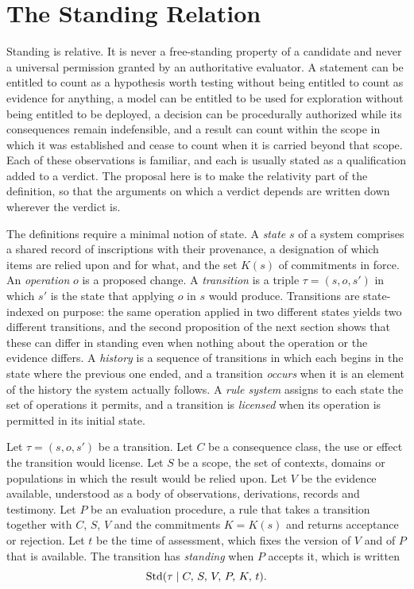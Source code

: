 \section{The Standing Relation}

Standing is relative. It is never a free-standing property of a candidate and never a universal permission granted by an authoritative evaluator. A statement can be entitled to count as a hypothesis worth testing without being entitled to count as evidence for anything, a model can be entitled to be used for exploration without being entitled to be deployed, a decision can be procedurally authorized while its consequences remain indefensible, and a result can count within the scope in which it was established and cease to count when it is carried beyond that scope. Each of these observations is familiar, and each is usually stated as a qualification added to a verdict. The proposal here is to make the relativity part of the definition, so that the arguments on which a verdict depends are written down wherever the verdict is.

The definitions require a minimal notion of state. A \emph{state} $s$ of a system comprises a shared record of inscriptions with their provenance, a designation of which items are relied upon and for what, and the set $K(s)$ of commitments in force. An \emph{operation} $o$ is a proposed change. A \emph{transition} is a triple $\tau=(s,o,s')$ in which $s'$ is the state that applying $o$ in $s$ would produce. Transitions are state-indexed on purpose: the same operation applied in two different states yields two different transitions, and the second proposition of the next section shows that these can differ in standing even when nothing about the operation or the evidence differs. A \emph{history} is a sequence of transitions in which each begins in the state where the previous one ended, and a transition \emph{occurs} when it is an element of the history the system actually follows. A \emph{rule system} assigns to each state the set of operations it permits, and a transition is \emph{licensed} when its operation is permitted in its initial state.

\begin{definition}[Standing]
Let $\tau=(s,o,s')$ be a transition. Let $C$ be a consequence class, the use or effect the transition would license. Let $S$ be a scope, the set of contexts, domains or populations in which the result would be relied upon. Let $V$ be the evidence available, understood as a body of observations, derivations, records and testimony. Let $P$ be an evaluation procedure, a rule that takes a transition together with $C$, $S$, $V$ and the commitments $K=K(s)$ and returns acceptance or rejection. Let $t$ be the time of assessment, which fixes the version of $V$ and of $P$ that is available. The transition has \emph{standing} when $P$ accepts it, which is written
\[
\operatorname{Std}(\tau \mid C,\,S,\,V,\,P,\,K,\,t).
\]
\end{definition}

